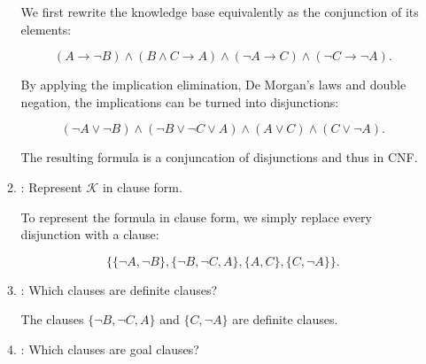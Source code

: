 \documentclass{acAssignment}
\begin{document}
\begin{enumerate}
\begin{enumerate}
                \begin{acSolution}
                    We first rewrite the knowledge base equivalently as the conjunction of its elements:
                    
                    \begin{equation}
                        (A \to \lnot B) \land (B \land C \to A) \land (\lnot A \to C) \land (\lnot C \to \lnot A).
                    \end{equation}
                    
                    By applying the implication elimination, De Morgan's laws and double negation, the implications can be turned into disjunctions:
                    
                    \begin{equation}
                        (\lnot A \lor \lnot B) \land (\lnot B \lor \lnot C \lor A) \land (A \lor C) \land (C \lor \lnot A).
                    \end{equation}
                    
                    The resulting formula is a conjuncation of disjunctions and thus in CNF.
                \end{acSolution}
            
            \item {}: Represent $\mathcal{K}$ in clause form.
            
                \begin{acSolution}
                    To represent the formula in clause form, we simply replace every disjunction with a clause:
                    
                    \begin{equation}
                        \big\{ \{\lnot A, \lnot B\}, \{\lnot B, \lnot C, A\}, \{A, C\}, \{C, \lnot A\} \big\}.
                    \end{equation}
                \end{acSolution}
            
            \item {}: Which clauses are definite clauses?
            
                \begin{acSolution}
                    The clauses $\{\lnot B, \lnot C, A\}$ and $\{C, \lnot A\}$ are definite clauses.
                \end{acSolution}
            
            \item {}: Which clauses are goal clauses?
            

\end{enumerate}
\end{enumerate}
\end{document}
